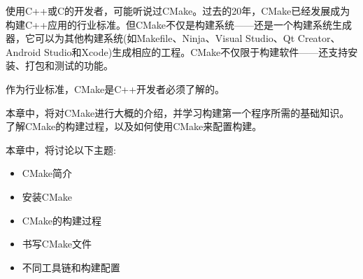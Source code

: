 使用C++或C的开发者，可能听说过CMake。过去的20年，CMake已经发展成为构建C++应用的行业标准。但CMake不仅是构建系统——还是一个构建系统生成器，它可以为其他构建系统(如Makefile、Ninja、Visual Studio、Qt Creator、Android Studio和Xcode)生成相应的工程。CMake不仅限于构建软件——还支持安装、打包和测试的功能。

作为行业标准，CMake是C++开发者必须了解的。

本章中，将对CMake进行大概的介绍，并学习构建第一个程序所需的基础知识。了解CMake的构建过程，以及如何使用CMake来配置构建。

本章中，将讨论以下主题:

\begin{itemize}
\item CMake简介
\item 安装CMake
\item CMake的构建过程
\item 书写CMake文件
\item 不同工具链和构建配置
\end{itemize}
